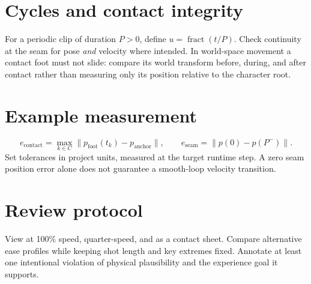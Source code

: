 \documentclass[10pt,letterpaper]{article}
\begin{document}
\section{Cycles and contact integrity}
For a periodic clip of duration $P>0$, define $u=\operatorname{fract}(t/P)$. Check continuity at the seam for pose \emph{and} velocity where intended. In world-space movement a contact foot must not slide: compare its world transform before, during, and after contact rather than measuring only its position relative to the character root.
\section{Example measurement}
\[e_{\mathrm{contact}}=\max_{k\in C}\|p_{\mathrm{foot}}(t_k)-p_{\mathrm{anchor}}\|,\qquad e_{\mathrm{seam}}=\|p(0)-p(P^-)\|.\]
Set tolerances in project units, measured at the target runtime step. A zero seam position error alone does not guarantee a smooth-loop velocity transition.
\section{Review protocol}
View at 100\% speed, quarter-speed, and as a contact sheet. Compare alternative ease profiles while keeping shot length and key extremes fixed. Annotate at least one intentional violation of physical plausibility and the experience goal it supports.
\end{document}
